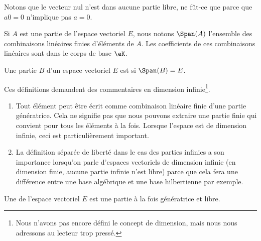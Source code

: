 \begin{remark}
	Notons que le vecteur nul n'est dans aucune partie libre, ne fût-ce que parce que \( a0=0\) n'implique pas \( a=0\).
\end{remark}

Si \( A\) est une partie de l'espace vectoriel \( E\), nous notons \( \Span(A)\) l'ensemble des combinaisons linéaires finies d'éléments de \( A\). Les coefficients de ces combinaisons linéaires sont dans le corps de base \( \eK\).

\begin{definition}
	Une partie \( B\) d'un espace vectoriel \( E\) est  si \( \Span(B)=E\).
\end{definition}

\begin{remark}
	Ces définitions demandent des commentaires en dimension infinie\footnote{Nous n'avons pas encore défini le concept de dimension, mais nous nous adressons au lecteur trop pressé.}.

	\begin{enumerate}
		\item
		      Tout élément peut être écrit comme combinaison linéaire finie d'une partie génératrice. Cela ne signifie pas que nous pouvons extraire une partie finie qui convient pour tous les éléments à la fois. Lorsque l'espace est de dimension infinie, ceci est particulièrement important.
		\item
		      La définition séparée de liberté dans le cas des parties infinies a son importance lorsqu'on parle d'espaces vectoriels de dimension infinie (en dimension finie, aucune partie infinie n'est libre) parce que cela fera une différence entre une base algébrique et une base hilbertienne par exemple.
	\end{enumerate}
\end{remark}

\begin{definition}[Base]        \label{DEFooNGDSooEDAwTh}
	Une  de l'espace vectoriel \( E\) est une partie à la fois génératrice et libre.
\end{definition}

